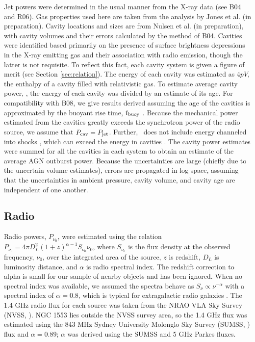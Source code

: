 \documentclass[12pt, preprint]{aastex}
\begin{document}
Jet powers were determined in the usual manner from the X-ray data
(see B04 and R06). Gas properties used here are taken from the
analysis by Jones et al. (in preparation). Cavity locations and sizes
are from Nulsen et al. (in preparation), with cavity volumes and their
errors calculated by the method of B04. Cavities were identified based
primarily on the presence of surface brightness depressions in the
X-ray emitting gas and their association with radio emission, though
the latter is not requisite. To reflect this fact, each cavity system
is given a figure of merit (see Section \ref{sec:relation}). The
energy of each cavity was estimated as $4pV$, the enthalpy of a cavity
filled with relativistic gas. To estimate average cavity power, \pcav,
the energy of each cavity was divided by an estimate of its age. For
compatibility with B08, we give results derived assuming the age of
the cavities is approximated by the buoyant rise time, $t_{\rm{buoy}}$
\citep{2001ApJ...554..261C, 2003ApJ...592..839B}. Because the
mechanical power estimated from the cavities greatly exceeds the
synchrotron power of the radio source, we assume that $P_{\rm{cav}} =
P_{\rm{jet}}$. Further, \pcav\ does not include energy channeled into shocks
\citep[\eg][]{2007ApJ...665.1057F, 2009ApJ...707.1034B}, which can
exceed the energy in cavities \citep[\eg][]{herca}. The cavity power
estimates were summed for all the cavities in each system to obtain an
estimate of the average AGN outburst power. Because the uncertainties
are large (chiefly due to the uncertain volume estimates), errors are
propagated in log space, assuming that the uncertainties in ambient
pressure, cavity volume, and cavity age are independent of one
another.

\subsection{Radio}
\label{sec:radio}

Radio powers, $P_{\nu_0}$, were estimated using the relation
$P_{\nu_0} = 4 \pi D_L^2 (1+z)^{\alpha-1} S_{\nu_0} \nu_0$, where
$S_{\nu_0}$ is the flux density at the observed frequency, $\nu_0$,
over the integrated area of the source, $z$ is redshift, $D_L$ is
luminosity distance, and $\alpha$ is radio spectral index. The
redshift correction to alpha is small for our sample of nearby objects
and has been ignored. When no spectral index was available, we assumed
the spectra behave as $S_{\nu} \propto \nu^{-\alpha}$ with a spectral
index of $\alpha = 0.8$, which is typical for extragalactic radio
galaxies \citep{1992ARA&A..30..575C}. The 1.4 GHz radio flux for each
source was taken from the NRAO VLA Sky Survey (NVSS,
\citealt{nvss}). NGC 1553 lies outside the NVSS survey area, so the
1.4 GHz flux was estimated using the 843 MHz Sydney University
Molonglo Sky Survey (SUMSS, \citealt{sumss1}) flux and $\alpha =
0.89$; $\alpha$ was derived using the SUMSS and 5 GHz Parkes
\citep{1970ApL.....5...29W} fluxes.
\end{document}
